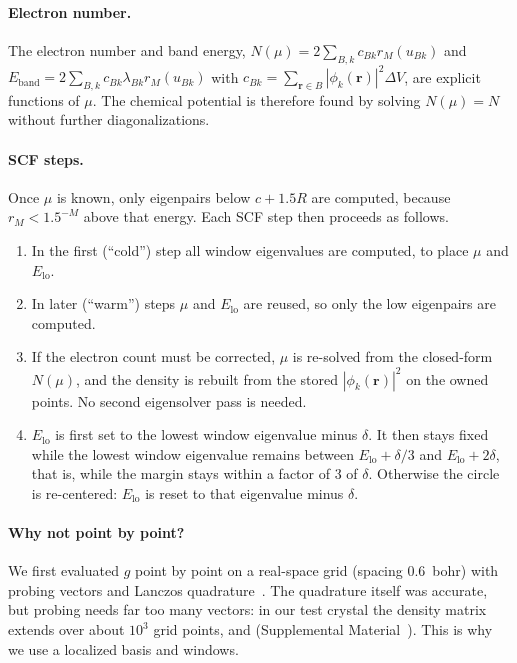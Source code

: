 \documentclass[aps,prb,twocolumn,superscriptaddress,floatfix,longbibliography]{revtex4-2}
\theoremstyle{remark}
\newcommand{\SM}{Supplemental Material~\cite{SM}}
\begin{document}
\paragraph*{Electron number.} The electron number and band energy,
$N(\mu)=2\sum_{B,k}c_{Bk}r_M(u_{Bk})$ and $E_\mathrm{band}=2\sum_{B,k}c_{Bk}\lambda_{Bk}r_M(u_{Bk})$ with
$c_{Bk}=\sum_{\bm r\in B}|\phi_k(\bm r)|^2\Delta V$, are explicit functions of $\mu$. The chemical potential is therefore
found by solving $N(\mu)=N$ without further diagonalizations.

\paragraph*{SCF steps.} Once $\mu$ is known, only eigenpairs below $c+1.5R$ are computed, because $r_M<1.5^{-M}$ above that
energy. Each SCF step then proceeds as follows.
\begin{enumerate}
\item In the first (``cold'') step all window eigenvalues are computed, to place $\mu$ and $E_\mathrm{lo}$.
\item In later (``warm'') steps $\mu$ and $E_\mathrm{lo}$ are reused, so only the low eigenpairs are computed.
\item If the electron count must be corrected, $\mu$ is re-solved from the closed-form $N(\mu)$, and the density is rebuilt
from the stored $|\phi_k(\bm r)|^2$ on the owned points. No second eigensolver pass is needed.
\item $E_\mathrm{lo}$ is first set to the lowest window eigenvalue minus $\delta$. It then stays fixed while the lowest window
eigenvalue remains between $E_\mathrm{lo}+\delta/3$ and $E_\mathrm{lo}+2\delta$, that is, while the margin stays within a
factor of 3 of $\delta$. Otherwise the circle is re-centered: $E_\mathrm{lo}$ is reset to that eigenvalue minus $\delta$.
\end{enumerate}

\paragraph*{Why not point by point?} We first evaluated $g$ point by point on a real-space grid (spacing 0.6~bohr) with
probing vectors and Lanczos quadrature~\cite{WeisseKPM2006}. The quadrature itself was accurate, but probing needs far too
many vectors: in our test crystal the density matrix extends over about $10^3$ grid points, and 
(\SM). This is why we use a localized basis and windows.
\end{document}

